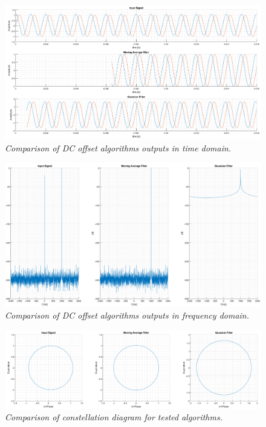 \documentclass[en,printmode]{mgr}
\begin{document}
			\vspace{1cm}	
			\begin{figure}[H]
    			\centering
   				\includegraphics[width=\textwidth]{plots/dc_comp.png}
   		 		\caption{\textit{Comparison of DC offset algorithms outputs in time domain.}}
			\end{figure}
			\vspace{1cm}		
			\begin{figure}[!htb]
    			\centering
   				\includegraphics[width=\textwidth]{plots/dc_f.png}
   		 		\caption{\textit{Comparison of DC offset algorithms outputs in frequency domain.}}
			\end{figure}		
			\begin{figure}[!htb]
    			\centering
   				\includegraphics[width=\textwidth]{plots/dc_c.png}
   		 		\caption{\textit{Comparison of constellation diagram for tested algorithms.}}
			\end{figure}
			
\end{document}
